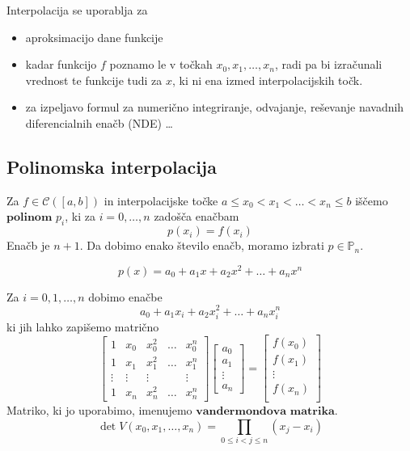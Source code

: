 \documentclass[a4paper,12pt]{article}
\theoremstyle{definition}
\theoremstyle{remark}
\newcommand{\Pp}{\mathbb{P}}
\begin{document}
Interpolacija se uporablja za
\begin{itemize}
    \item aproksimacijo dane funkcije
    \item kadar funkcijo $f$ poznamo le v točkah $x_0, x_1, \dots, x_n$, radi pa bi izračunali vrednost te funkcije tudi za $x$, ki ni ena izmed interpolacijskih točk.
    \item za izpeljavo formul za numerično integriranje, odvajanje, reševanje navadnih diferencialnih enačb (NDE) \dots
\end{itemize}

\subsection{Polinomska interpolacija}
Za $f \in \mathscr{C}([a, b])$ in interpolacijske točke $a \leq x_0 < x_1 < \dots < x_n \leq b$ iščemo $\textbf{polinom}$ $p_i$, ki za $i = 0, \dots, n$ zadošča enačbam
\begin{equation*}
    p(x_i) = f(x_i)
\end{equation*}
Enačb je $n+1$. Da dobimo enako število enačb, moramo izbrati $p \in \Pp_n$.

\begin{equation*}
    p(x) = a_0 + a_1 x + a_2 x^2 + \dots + a_n x^n
\end{equation*}

Za  $i = 0, 1, \dots, n$ dobimo enačbe
\begin{equation*}
    a_0 + a_1 x_i + a_2 x_i^2 + \dots + a_n x_i^n
\end{equation*}
ki jih lahko zapišemo matrično
\begin{equation*}
    \begin{bmatrix}
        1 & x_0 & x_0^2 & \dots & x_0^n \\
        1 & x_1 & x_1^2 & \dots & x_1^n \\
    \vdots & \vdots & \vdots &  & \vdots \\
        1 & x_n & x_n^2 & \dots & x_n^n 
    \end{bmatrix}
    \begin{bmatrix}
        a_0 \\
        a_1 \\
        \vdots \\
        a_n
    \end{bmatrix}
    =
    \begin{bmatrix}
        f(x_0) \\
        f(x_1) \\
        \vdots \\
        f(x_n) \\
    \end{bmatrix}
\end{equation*}
Matriko, ki jo uporabimo, imenujemo $\textbf{vandermondova matrika}$.
\begin{equation*}
    \det V(x_0, x_1, \dots, x_n) = \prod_{0 \leq i < j \leq n} (x_j - x_i)
\end{equation*}
\end{document}
